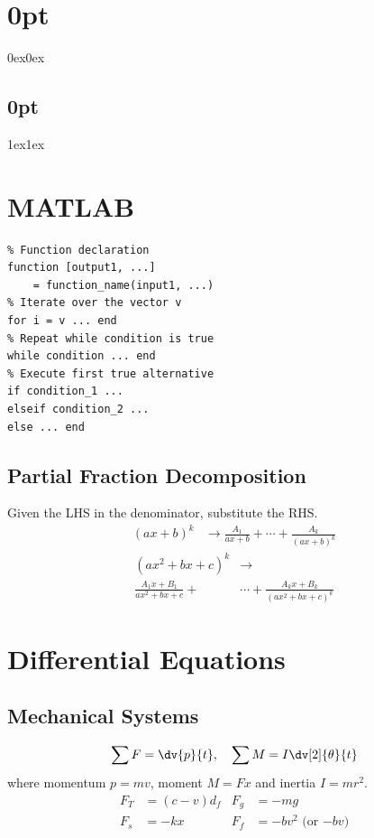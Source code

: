 \documentclass{article}
\begin{document}
\titlespacing*\section{0pt}{0ex}{0ex}
\titlespacing*\subsection{0pt}{1ex}{1ex}
%
\setlength{\abovecaptionskip}{-5pt}
\setlength{\textfloatsep}{0pt}
%
\setlength{\abovedisplayskip}{1pt}
\setlength{\belowdisplayskip}{1pt}
%
\lstset{language=Matlab, upquote=true}
%
\begin{multicols}{3}
    \section*{MATLAB}
    \lstset{belowskip=0pt, aboveskip=0pt}
    \begin{lstlisting}
% Function declaration
function [output1, ...]
    = function_name(input1, ...)
% Iterate over the vector v
for i = v ... end 
% Repeat while condition is true
while condition ... end
% Execute first true alternative
if condition_1 ...
elseif condition_2 ... 
else ... end
\end{lstlisting}
    \subsection*{Partial Fraction Decomposition}
    Given the LHS in the denominator, substitute the RHS\@.
    \begin{align*}
        \left(ax+b\right)^k & \to \frac{A_1}{ax+b} + \cdots + \frac{A_k}{\left( ax+b \right)^k}
    \end{align*}
    \begin{align*}
        \left(ax^2+bx+c\right)^k     & \to                                                  \\
        \frac{A_1x+B_1}{ax^2+bx+c} + & \cdots + \frac{A_k x+B_k}{\left( ax^2+bx+c \right)^k}
    \end{align*}
    \section*{Differential Equations}
    \subsection*{Mechanical Systems}
    \begin{equation*}
        \sum F = \dv{p}{t},\quad \sum M = I \dv[2]{\theta}{t}
    \end{equation*}
    where momentum \(p = mv\), moment \(M=Fx\) and inertia \(I=mr^2\).
    \begin{align*}
        F_T & = \left( c - v \right) d_f & F_g & = -mg                       \\
        F_s & = -kx                      & F_f & = -b v^2 \text{ (or \(-bv\))}
    \end{align*}

\end{multicols}
\end{document}
